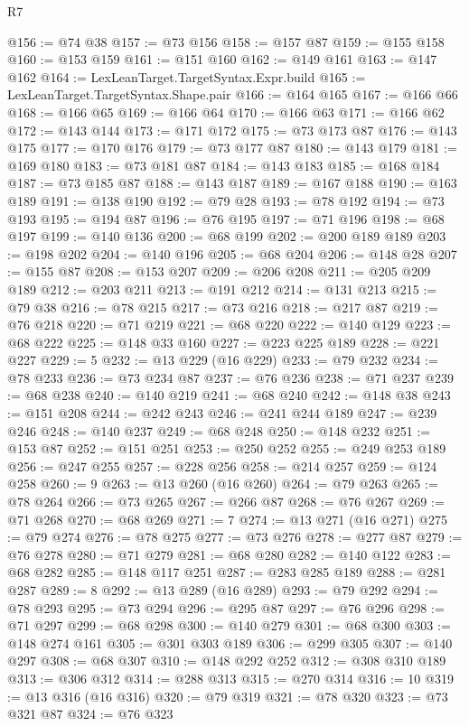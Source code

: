\begin{lexlean}{R7}
\begin{coremodule}
@156 := @74 @38
@157 := @73 @156
@158 := @157 @87
@159 := @155 @158
@160 := @153 @159
@161 := @151 @160
@162 := @149 @161
@163 := @147 @162
@164 := LexLeanTarget.TargetSyntax.Expr.build
@165 := LexLeanTarget.TargetSyntax.Shape.pair
@166 := @164 @165
@167 := @166 @66
@168 := @166 @65
@169 := @166 @64
@170 := @166 @63
@171 := @166 @62
@172 := @143 @144
@173 := @171 @172
@175 := @73 @173 @87
@176 := @143 @175
@177 := @170 @176
@179 := @73 @177 @87
@180 := @143 @179
@181 := @169 @180
@183 := @73 @181 @87
@184 := @143 @183
@185 := @168 @184
@187 := @73 @185 @87
@188 := @143 @187
@189 := @167 @188
@190 := @163 @189
@191 := @138 @190
@192 := @79 @28
@193 := @78 @192
@194 := @73 @193
@195 := @194 @87
@196 := @76 @195
@197 := @71 @196
@198 := @68 @197
@199 := @140 @136
@200 := @68 @199
@202 := @200 @189 @189
@203 := @198 @202
@204 := @140 @196
@205 := @68 @204
@206 := @148 @28
@207 := @155 @87
@208 := @153 @207
@209 := @206 @208
@211 := @205 @209 @189
@212 := @203 @211
@213 := @191 @212
@214 := @131 @213
@215 := @79 @38
@216 := @78 @215
@217 := @73 @216
@218 := @217 @87
@219 := @76 @218
@220 := @71 @219
@221 := @68 @220
@222 := @140 @129
@223 := @68 @222
@225 := @148 @33 @160
@227 := @223 @225 @189
@228 := @221 @227
@229 := 5
@232 := @13 @229 (@16 @229)
@233 := @79 @232
@234 := @78 @233
@236 := @73 @234 @87
@237 := @76 @236
@238 := @71 @237
@239 := @68 @238
@240 := @140 @219
@241 := @68 @240
@242 := @148 @38
@243 := @151 @208
@244 := @242 @243
@246 := @241 @244 @189
@247 := @239 @246
@248 := @140 @237
@249 := @68 @248
@250 := @148 @232
@251 := @153 @87
@252 := @151 @251
@253 := @250 @252
@255 := @249 @253 @189
@256 := @247 @255
@257 := @228 @256
@258 := @214 @257
@259 := @124 @258
@260 := 9
@263 := @13 @260 (@16 @260)
@264 := @79 @263
@265 := @78 @264
@266 := @73 @265
@267 := @266 @87
@268 := @76 @267
@269 := @71 @268
@270 := @68 @269
@271 := 7
@274 := @13 @271 (@16 @271)
@275 := @79 @274
@276 := @78 @275
@277 := @73 @276
@278 := @277 @87
@279 := @76 @278
@280 := @71 @279
@281 := @68 @280
@282 := @140 @122
@283 := @68 @282
@285 := @148 @117 @251
@287 := @283 @285 @189
@288 := @281 @287
@289 := 8
@292 := @13 @289 (@16 @289)
@293 := @79 @292
@294 := @78 @293
@295 := @73 @294
@296 := @295 @87
@297 := @76 @296
@298 := @71 @297
@299 := @68 @298
@300 := @140 @279
@301 := @68 @300
@303 := @148 @274 @161
@305 := @301 @303 @189
@306 := @299 @305
@307 := @140 @297
@308 := @68 @307
@310 := @148 @292 @252
@312 := @308 @310 @189
@313 := @306 @312
@314 := @288 @313
@315 := @270 @314
@316 := 10
@319 := @13 @316 (@16 @316)
@320 := @79 @319
@321 := @78 @320
@323 := @73 @321 @87
@324 := @76 @323

\end{coremodule}
\end{lexlean}

